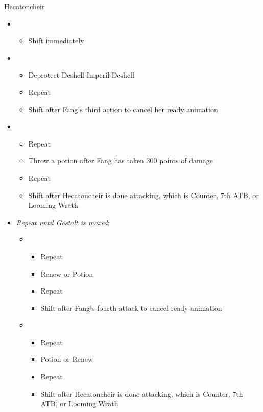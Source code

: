 \begin{battle}[1:38]{Hecatoncheir}
		\begin{itemize}
			\item \first
			      \begin{itemize}
				      \item Shift immediately
			      \end{itemize}
			\item \third
			      \begin{itemize}
				      \item Deprotect-Deshell-Imperil-Deshell
				      \item Repeat
				      \item Shift after Fang's third action to cancel her ready animation
			      \end{itemize}
			\item \fourth
			      \begin{itemize}
				      \item Repeat
				      \item Throw a potion after Fang has taken 300 points of damage
				      \item Repeat
				      \item Shift after Hecatoncheir is done attacking, which is Counter, 7th ATB, or Looming Wrath
			      \end{itemize}
			      \columnbreak
			\item \textit{Repeat until Gestalt is maxed}:
			      \begin{itemize}
				      \item \third
				            \begin{itemize}
					            \item Repeat
					            \item Renew or Potion
					            \item Repeat
					            \item Shift after Fang's fourth attack to cancel ready animation
				            \end{itemize}
				      \item \fourth
				            \begin{itemize}
					            \item Repeat
					            \item Potion or Renew
					            \item Repeat
					            \item Shift after Hecatoncheir is done attacking, which is Counter, 7th ATB, or Looming Wrath
				            \end{itemize}
			      \end{itemize}
		\end{itemize}
\end{battle}

